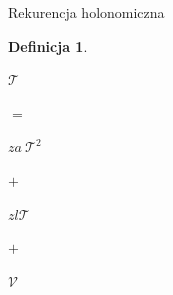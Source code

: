 \documentclass[final]{beamer}
\theoremstyle{bluetheorem}
\theoremstyle{bluetheorem}
\newtheorem{mydefinition}[mytheorem]{Definicja}
\theoremstyle{greentheorem}
\newcommand{\gf}[1]{\ensuremath{\mathcal{#1}}}
\begin{document}
\begin{frame}{Rekurencja holonomiczna}
    \begin{mydefinition}
        \begin{center}
            \begin{minipage}[t]{.2\textwidth}
                \begin{center}
                    \(\gf{T}\)\\
                \end{center}
            \end{minipage}%
            \begin{minipage}[t]{.05\textwidth}
                \begin{center}
                    \(=\)\\
                \end{center}
            \end{minipage}%
            \begin{minipage}[t]{.2\textwidth}
                \begin{center}
                    \(z a~\gf{T}^2\)\\
                \end{center}
            \end{minipage}%
            \begin{minipage}[t]{.05\textwidth}
                \begin{center}
                    \(+\)\\
                \end{center}
            \end{minipage}%
            \begin{minipage}[t]{.2\textwidth}
                \begin{center}
                    \(z l \gf{T}\)\\
                \end{center}
            \end{minipage}%
            \begin{minipage}[t]{.05\textwidth}
                \begin{center}
                    \(+\)\\
                \end{center}
            \end{minipage}%
            \begin{minipage}[t]{.2\textwidth}
                \begin{center}
                    \(\gf{V}\)\\
                \end{center}
            \end{minipage}%
        \end{center}


\end{mydefinition}
\end{frame}
\end{document}
